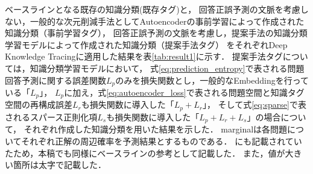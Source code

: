 \begin{table}[!htb]
\caption{各知識分類の知識獲得予測における予測性能}
\label{tab:result1}
\begin{center}
\end{center}
\end{table}


ベースラインとなる既存の知識分類(既存タグ)と，
回答正誤予測の文脈を考慮しない，一般的な次元削減手法としてAutoencoderの事前学習によって作成された知識分類（事前学習タグ），
回答正誤予測の文脈を考慮し，提案手法の知識分類学習モデルによって作成された知識分類（提案手法タグ）
をそれぞれDeep Knowledge Tracingに適用した結果を表\ref{tab:result1}に示す．
提案手法タグについては，知識分類学習モデルにおいて，
式\ref{eq:prediction_entropy}で表される問題回答予測に関する誤差関数$L_p$のみを損失関数とし，一般的なEmbeddingを行っている「$L_p$」，
$L_pに加え，$式\ref{eq:autoencoder_loss}で表される問題空間と知識タグ空間の再構成誤差$L_r$も損失関数に導入した「$L_p + L_r$」，
そして式\ref{eq:sparse}で表されるスパース正則化項$L_s$も損失関数に導入した「$L_p + L_r + L_s$」の場合について，
それぞれ作成した知識分類を用いた結果を示した．
marginalは各問題についてそれぞれ正解の周辺確率を予測結果とするものである．
\cite{piech2015deep}にも記載されていたため，本稿でも同様にベースラインの参考として記載した．
また，値が大きい箇所は太字で記載した．

